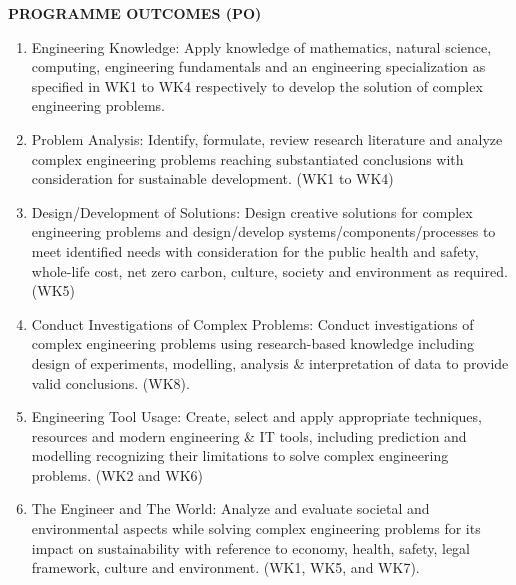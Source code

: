 \begin{center}
\Large	\textbf{PROGRAMME OUTCOMES (PO)}
\end{center}
\begin{enumerate}[
	label=\textbf{PO\arabic*:},
	labelwidth=2.5cm,
	labelsep=1.5em,
	leftmargin=2cm,
	itemsep=0.6em
	]
	\large
	\item Engineering Knowledge: Apply knowledge of mathematics, natural science,
	computing, engineering fundamentals and an engineering specialization as specified
	in WK1 to WK4 respectively to develop the solution of complex engineering
	problems.
	
	\item Problem Analysis: Identify, formulate, review research literature and analyze
	complex engineering problems reaching substantiated conclusions with
	consideration for sustainable development. (WK1 to WK4)
	
	\item Design/Development of Solutions: Design creative solutions for complex
	engineering problems and design/develop systems/components/processes to meet
	identified needs with consideration for the public health and safety, whole-life cost,
	net zero carbon, culture, society and environment as required. (WK5)
	
	\item Conduct Investigations of Complex Problems: Conduct investigations of complex
	engineering problems using research-based knowledge including design of
	experiments, modelling, analysis \& interpretation of data to provide valid conclusions.
	(WK8).
	
	\item Engineering Tool Usage: Create, select and apply appropriate techniques,
	resources and modern engineering \& IT tools, including prediction and modelling
	recognizing their limitations to solve complex engineering problems. (WK2 and WK6)
	
	\item The Engineer and The World: Analyze and evaluate societal and environmental
	aspects while solving complex engineering problems for its impact on sustainability
	with reference to economy, health, safety, legal framework, culture and environment.
	(WK1, WK5, and WK7).
\end{enumerate}